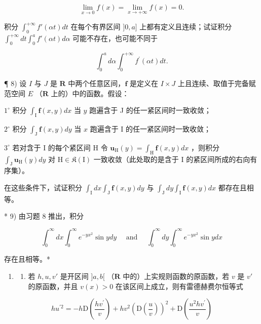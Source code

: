 \[
\lim _ {x \to 0} f (x) = \lim _ {x \to + \infty} f (x) = 0.
\]

积分 \(\int_0^{+\infty}f'(\alpha t)dt\) 在每个有界区间 \(]0,a]\) 上都有定义且连续；试证积分 \(\int_0^{+\infty}dt\int_0^a f'(\alpha t)d\alpha\) 可能不存在，也可能不同于

\[
\int_ {0} ^ {a} d \alpha \int_ {0} ^ {+ \infty} f ^ {\prime} (\alpha t) d t.
\]

¶ 8) 设 \(I\) 与 \(J\) 是 \(\mathbf{R}\) 中两个任意区间，\(\mathbf{f}\) 是定义在 \(I \times J\) 上且连续、取值于完备赋范空间 \(E\) （\(\mathbf{R}\) 上的）中的函数。假设：

\(1^{\circ}\) 积分 \(\int_{\mathrm{I}}\mathbf{f}(x,y)dx\) 当 \(y\) 跑遍含于 J 的任一紧区间时一致收敛；

\(2^{\circ}\) 积分 \(\int_{\mathrm{J}}\mathbf{f}(x,y)dy\) 当 \(x\) 跑遍含于 I 的任一紧区间时一致收敛；

\(3^{\circ}\) 若对含于 I 的每个紧区间 \(\mathrm{H}\) 令 \(\mathbf{u}_{\mathrm{H}}(y) = \int_{\mathrm{H}} \mathbf{f}(x, y) dx\) ，则积分 \(\int_{\mathrm{J}} \mathbf{u}_{\mathrm{H}}(y) dy\) 对 \(\mathrm{H} \in \mathfrak{K}(\mathrm{I})\) 一致收敛（此处取的是含于 I 的紧区间所成的右向有序集）。

在这些条件下，试证积分 \(\int_{\mathrm{I}} dx \int_{\mathrm{J}} \mathbf{f}(x, y) dy\) 与 \(\int_{\mathrm{J}} dy \int_{\mathrm{I}} \mathbf{f}(x, y) dx\) 都存在且相等。

* 9) 由习题 8 推出，积分

\[
\int_ {0} ^ {\infty} d x \int_ {0} ^ {\infty} e ^ {- y x ^ {2}} \sin y d y \quad \text { and } \quad \int_ {0} ^ {\infty} d y \int_ {0} ^ {\infty} e ^ {- y x ^ {2}} \sin y d x
\]

存在且相等。*

\begin{enumerate}
\def\labelenumi{\arabic{enumi})}
\setcounter{enumi}{9}
\tightlist
\item
  \begin{enumerate}
  \def\labelenumii{\alph{enumii})}
  \tightlist
  \item
    若 \(h, u, v'\) 是开区间 \(]a, b[\) （\(\mathbf{R}\) 中的）上实规则函数的原函数，若 \(v\) 是 \(v'\) 的原函数，并且 \(v(x) > 0\) 在该区间上成立，则有雷德赫费尔恒等式
  \end{enumerate}
\end{enumerate}

\[
h u ^ {\prime 2} = - h \mathrm{D} \left(\frac {h v ^ {\prime}}{v}\right) + h v ^ {2} \left(\mathrm{D} \left(\frac {u}{v}\right)\right) ^ {2} + \mathrm{D} \left(\frac {u ^ {2} h v ^ {\prime}}{v}\right)
\]

